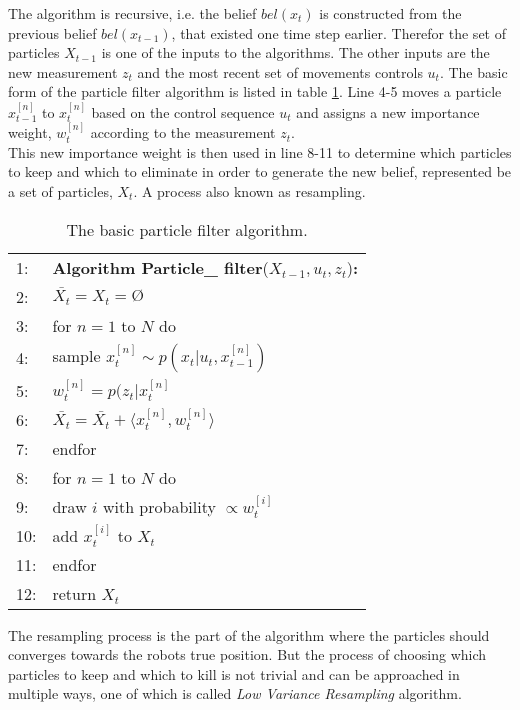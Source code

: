 The algorithm is recursive, i.e. the belief $bel(x_t)$ is constructed from the previous belief $bel(x_{t-1})$, that existed one time step earlier. 
Therefor the set of particles $X_{t-1}$ is one of the inputs to the algorithms.
The other inputs are the new measurement $z_t$ and the most recent set of movements controls $u_t$.
The basic form of the particle filter algorithm is listed in table \ref{tab:partAlgo}.
Line 4-5 moves a particle $x_{t-1}^{[n]}$ to $x_t^{[n]}$ based on the control sequence $u_t$ and assigns a new importance weight, $w_t^{[n]}$ according to the measurement $z_t$.\\
This new importance weight is then used in line 8-11 to determine which particles to keep and which to eliminate in order to generate the new belief, represented be a set of particles, $X_t$.
A process also known as resampling.

\begin{table}[!b]
    \caption[Short Caption]{The basic particle filter algorithm.}
    \label{tab:partAlgo}
\begin{tabular}{|l p{12cm}|}
    
    \hline
    1: \qquad  & \textbf{Algorithm Particle\_ filter}($X_{t-1}, u_t, z_t$)\textbf{:} \\
    2: \qquad  & \qquad $\bar{X_t} = X_t = Ø$ \\
    3: \qquad  & \qquad for $n = 1$ to $N$ do\\
    4: \qquad  & \qquad \qquad sample $x_t^{[n]} \sim p(x_t | u_t, x_{t-1}^{[n]})$\\
    5: \qquad  & \qquad \qquad $w_t^{[n]}=p(z_t|x_t^{[n]}$\\
    6: \qquad  & \qquad \qquad $\bar{X_t} = \bar{X_t} + \langle x_t^{[n]}, w_t^{[n]} \rangle $  \\
    7: \qquad  & \qquad endfor \\
    8: \qquad  & \qquad  for $n = 1$ to $N$ do\\
    9: \qquad  & \qquad \qquad draw $i$ with probability $\propto w_t^{[i]}$\\
    10: \qquad & \qquad \qquad add $x_t^{[i]}$ to $X_t$\\
    11: \qquad & \qquad endfor\\
    12: \qquad & \qquad return $X_t$\\
    \hline
\end{tabular}
\end{table}

\noindent The resampling process is the part of the algorithm where the particles should converges towards the robots true position.
But the process of choosing which particles to keep and which to kill is not trivial and can be approached in multiple ways, one of which is called \emph{Low Variance Resampling} algorithm.

